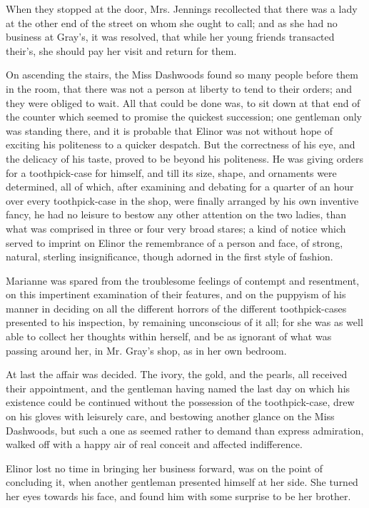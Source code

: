 When they stopped at the door, Mrs. Jennings recollected that there was a lady at the other end of the street on whom she ought to call; and as she had no business at Gray's, it was resolved, that while her young friends transacted their's, she should pay her visit and return for them.

On ascending the stairs, the Miss Dashwoods found so many people before them in the room, that there was not a person at liberty to tend to their orders; and they were obliged to wait. All that could be done was, to sit down at that end of the counter which seemed to promise the quickest succession; one gentleman only was standing there, and it is probable that Elinor was not without hope of exciting his politeness to a quicker despatch. But the correctness of his eye, and the delicacy of his taste, proved to be beyond his politeness. He was giving orders for a toothpick-case for himself, and till its size, shape, and ornaments were determined, all of which, after examining and debating for a quarter of an hour over every toothpick-case in the shop, were finally arranged by his own inventive fancy, he had no leisure to bestow any other attention on the two ladies, than what was comprised in three or four very broad stares; a kind of notice which served to imprint on Elinor the remembrance of a person and face, of strong, natural, sterling insignificance, though adorned in the first style of fashion.

Marianne was spared from the troublesome feelings of contempt and resentment, on this impertinent examination of their features, and on the puppyism of his manner in deciding on all the different horrors of the different toothpick-cases presented to his inspection, by remaining unconscious of it all; for she was as well able to collect her thoughts within herself, and be as ignorant of what was passing around her, in Mr. Gray's shop, as in her own bedroom.

At last the affair was decided. The ivory, the gold, and the pearls, all received their appointment, and the gentleman having named the last day on which his existence could be continued without the possession of the toothpick-case, drew on his gloves with leisurely care, and bestowing another glance on the Miss Dashwoods, but such a one as seemed rather to demand than express admiration, walked off with a happy air of real conceit and affected indifference.

Elinor lost no time in bringing her business forward, was on the point of concluding it, when another gentleman presented himself at her side. She turned her eyes towards his face, and found him with some surprise to be her brother.

